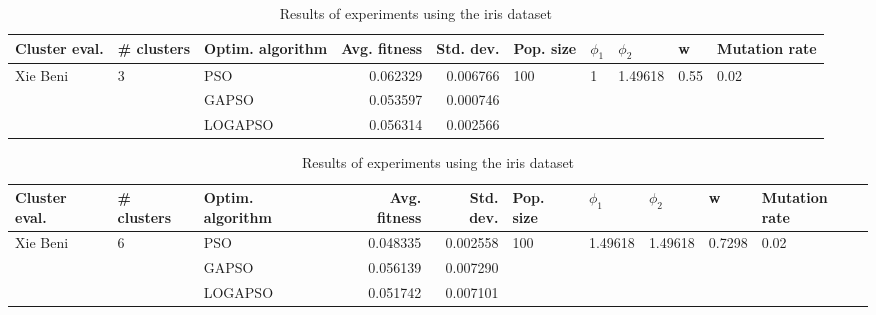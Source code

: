 \documentclass{article}
\begin{document}
\begin{table}
\centering
\caption{Results of experiments using the iris dataset}
\begin{tabular}{lllrrlllll}
\toprule
            Cluster eval. &        \# clusters & Optim. algorithm &  Avg. fitness &  Std. dev. &            Pop. size &         $\phi_{1}$ &               $\phi_{2}$ &                     w &         Mutation rate \\
\midrule
\multirow{3}{*}{Xie Beni} & \multirow{3}{*}{3} &              PSO &      0.062329 &   0.006766 & \multirow{3}{*}{100} & \multirow{3}{*}{1} & \multirow{3}{*}{1.49618} & \multirow{3}{*}{0.55} & \multirow{3}{*}{0.02} \\
                          &                    &            GAPSO &      0.053597 &   0.000746 &                      &                    &                          &                       &                       \\
                          &                    &          LOGAPSO &      0.056314 &   0.002566 &                      &                    &                          &                       &                       \\
\bottomrule
\end{tabular}
\end{table}
\begin{table}
\centering
\caption{Results of experiments using the iris dataset}
\begin{tabular}{lllrrlllll}
\toprule
            Cluster eval. &        \# clusters & Optim. algorithm &  Avg. fitness &  Std. dev. &            Pop. size &               $\phi_{1}$ &               $\phi_{2}$ &                       w &         Mutation rate \\
\midrule
\multirow{3}{*}{Xie Beni} & \multirow{3}{*}{6} &              PSO &      0.048335 &   0.002558 & \multirow{3}{*}{100} & \multirow{3}{*}{1.49618} & \multirow{3}{*}{1.49618} & \multirow{3}{*}{0.7298} & \multirow{3}{*}{0.02} \\
                          &                    &            GAPSO &      0.056139 &   0.007290 &                      &                          &                          &                         &                       \\
                          &                    &          LOGAPSO &      0.051742 &   0.007101 &                      &                          &                          &                         &                       \\
\bottomrule
\end{tabular}
\end{table}
\end{document}
